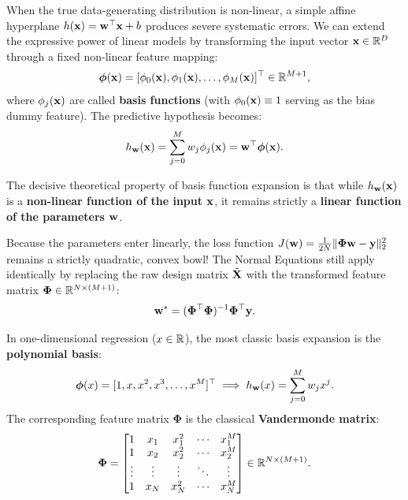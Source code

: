 When the true data-generating distribution is non-linear, a simple affine hyperplane $h(\mathbf{x}) = \mathbf{w}^\top \mathbf{x} + b$ produces severe systematic errors. We can extend the expressive power of linear models by transforming the input vector $\mathbf{x} \in \mathbb{R}^D$ through a fixed non-linear feature mapping:
\begin{equation}
\boldsymbol{\phi}(\mathbf{x}) = [\phi_0(\mathbf{x}), \phi_1(\mathbf{x}), \dots, \phi_M(\mathbf{x})]^\top \in \mathbb{R}^{M+1},
\label{eq:basis_functions}
\end{equation}
where $\phi_j(\mathbf{x})$ are called \textbf{basis functions} (with $\phi_0(\mathbf{x}) \equiv 1$ serving as the bias dummy feature). The predictive hypothesis becomes:
\begin{equation}
h_{\mathbf{w}}(\mathbf{x}) = \sum_{j=0}^M w_j \phi_j(\mathbf{x}) = \mathbf{w}^\top \boldsymbol{\phi}(\mathbf{x}).
\label{eq:basis_predictor}
\end{equation}

\begin{intuition}
The decisive theoretical property of basis function expansion is that while $h_{\mathbf{w}}(\mathbf{x})$ is a \textbf{non-linear function of the input $\mathbf{x}$}, it remains strictly a \textbf{linear function of the parameters $\mathbf{w}$}. 

Because the parameters enter linearly, the loss function $J(\mathbf{w}) = \frac{1}{2N}\|\boldsymbol{\Phi}\mathbf{w} - \mathbf{y}\|_2^2$ remains a strictly quadratic, convex bowl! The Normal Equations still apply identically by replacing the raw design matrix $\tilde{\mathbf{X}}$ with the transformed feature matrix $\boldsymbol{\Phi} \in \mathbb{R}^{N \times (M+1)}$:
\begin{equation}
\mathbf{w}^* = (\boldsymbol{\Phi}^\top \boldsymbol{\Phi})^{-1}\boldsymbol{\Phi}^\top \mathbf{y}.
\label{eq:basis_normal_equations}
\end{equation}
\end{intuition}

In one-dimensional regression ($x \in \mathbb{R}$), the most classic basis expansion is the \textbf{polynomial basis}:
\begin{equation}
\boldsymbol{\phi}(x) = [1, x, x^2, x^3, \dots, x^M]^\top \implies h_{\mathbf{w}}(x) = \sum_{j=0}^M w_j x^j.
\label{eq:polynomial_basis}
\end{equation}
The corresponding feature matrix $\boldsymbol{\Phi}$ is the classical \textbf{Vandermonde matrix}:
\begin{equation}
\boldsymbol{\Phi} = \begin{bmatrix} 1 & x_1 & x_1^2 & \cdots & x_1^M \\ 1 & x_2 & x_2^2 & \cdots & x_2^M \\ \vdots & \vdots & \vdots & \ddots & \vdots \\ 1 & x_N & x_N^2 & \cdots & x_N^M \end{bmatrix} \in \mathbb{R}^{N \times (M+1)}.
\label{eq:vandermonde_matrix}
\end{equation}

